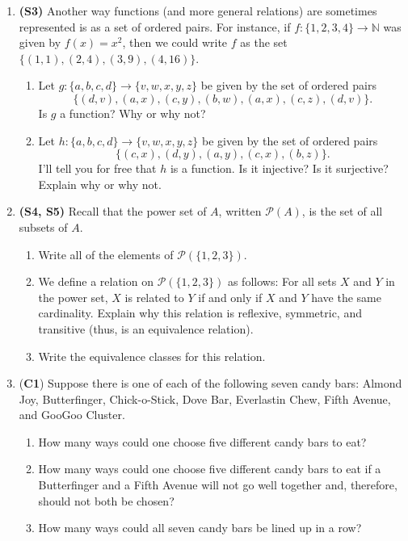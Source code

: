 \documentclass[12pt]{article}
\begin{document}
\begin{enumerate}
\item \textbf{(S3)} Another way functions (and more general relations) are sometimes represented is as a set of ordered pairs. For instance, if $f:\{1,2,3,4\}\to\mathbb{N}$ was given by $f(x) = x^2$, then we could write $f$ as the set $\{(1,1), (2,4), (3,9), (4, 16)\}$.

\begin{enumerate}
\item Let $g:\{a,b,c,d\}\to\{v,w,x,y,z\}$  be given by the set of ordered pairs \[\{(d,v), (a,x), (c,y), (b,w), (a,x), (c,z), (d,v)\}.\] Is $g$ a function? Why or why not?
\item Let $h:\{a,b,c,d\}\to\{v,w,x,y,z\}$ be given by the set of ordered pairs \[\{(c,x),(d,y),(a,y),(c,x),(b,z)\}.\]
I'll tell you for free that $h$ is a function. Is it injective? Is it surjective? Explain why or why not.
\end{enumerate}

\item \textbf{(S4, S5)}  Recall that the power set of $A$, written $\mathcal{P}(A)$, is the set of all subsets of $A$.

\begin{enumerate}
    \item Write all of the elements of $\mathcal{P}(\{1,2,3\})$.
    \item We define a relation on $\mathcal{P}(\{1,2,3\})$ as follows: For all sets $X$ and $Y$ in the power set, $X$ is related to $Y$ if and only if $X$ and $Y$ have the same cardinality. Explain why this relation is reflexive, symmetric, and transitive (thus, is an equivalence relation).
    \item Write the equivalence classes for this relation.
    
\end{enumerate}

\item (\textbf{C1}) Suppose there is one of each of the following seven candy bars: Almond Joy, Butterfinger, Chick-o-Stick, Dove Bar, Everlastin Chew, Fifth Avenue, and GooGoo Cluster.

\begin{enumerate}
    \item How many ways could one choose five different candy bars to eat?
    \item How many ways could one choose five different candy bars to eat if a Butterfinger and a Fifth Avenue will not go well together and, therefore, should not both be chosen?
    \item How many ways could all seven candy bars be lined up in a row?
\end{enumerate}
 

\end{enumerate}
\end{document}
